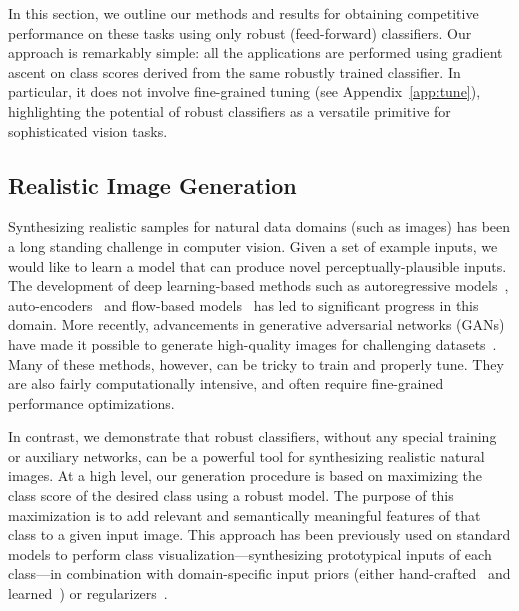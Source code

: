 \documentclass{article}
\begin{document}
In this section, we outline our methods and results for obtaining competitive
performance on these tasks using only robust (feed-forward) classifiers. Our
approach is remarkably simple: all the applications are performed using
gradient ascent on class scores derived from the same robustly
trained classifier. In particular, it does not involve
fine-grained tuning (see Appendix~\ref{app:tune}), highlighting the potential of
robust classifiers as a versatile primitive for sophisticated vision tasks. 
 
\subsection{Realistic Image Generation}
\label{sec:generation}
Synthesizing realistic samples for natural data domains (such as 
images) has been a long standing challenge in computer vision.
Given a set of example inputs, we would like to 
learn a model that can produce novel perceptually-plausible inputs. The 
development of deep learning-based methods such as autoregressive
models~\cite{hochreiter1997long,graves2013generating,van2016pixel},
auto-encoders~\cite{vincent2010stacked,kingma2013autoencoding} and flow-based
models~\cite{dinh2014nice,rezende2015variational,dinh2017density,kingma2018glow}
has led to significant progress in this domain.
More recently, advancements in 
generative adversarial networks (GANs)~\cite{goodfellow2014generative} 
have made it possible to generate high-quality images for challenging
datasets~\cite{zhang2018self,karras2018progressive,brock2019large}.
Many of these methods, however, can be tricky to train and properly 
tune. They are also fairly computationally intensive, and often require fine-grained 
performance optimizations.

In contrast, we demonstrate that robust classifiers, without any special 
training or auxiliary networks, can be a powerful tool for synthesizing 
realistic natural images. At a high level, our generation procedure 
is based on maximizing the class score of the desired class using a 
robust model. The purpose of this maximization is to add relevant and semantically 
meaningful features of that class to a given input image. 
This approach has been previously used on standard models to perform class
visualization---synthesizing prototypical inputs of each class---in combination
with domain-specific input priors (either hand-crafted~\cite{nguyen2015deep} and
learned~\cite{nguyen2016synthesizing,nguyen2017plug}) or
regularizers~\cite{simonyan2013deep,mordvintsev2015inceptionism,oygard2015visualizing,tyka2016class}.
\end{document}
